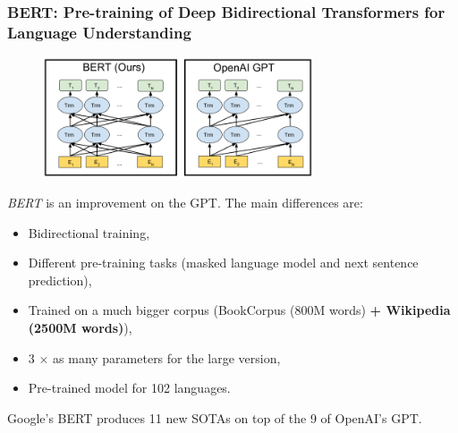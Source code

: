 \documentclass[9pt]{beamer}
\begin{document}
\begin{frame}
  \frametitle{BERT: Pre-training of Deep Bidirectional Transformers
    for Language Understanding}

  \begin{figure}
    \includegraphics[width = 8cm]{images/bert.png}
  \end{figure}

  \emph{BERT} is an improvement on the GPT. The main differences are:
  \begin{itemize}
  \item Bidirectional training,
  \item Different pre-training tasks (masked language model and next
    sentence prediction),
  \item Trained on a much bigger corpus (BookCorpus (800M words) \textbf{+
    Wikipedia (2500M words)}),
  \item 3 $\times$ as many parameters for the large version,
  \item Pre-trained model for 102 languages.
  \end{itemize}

  Google's BERT produces 11 new SOTAs on top of the 9 of OpenAI's GPT.
\end{frame}
\end{document}
